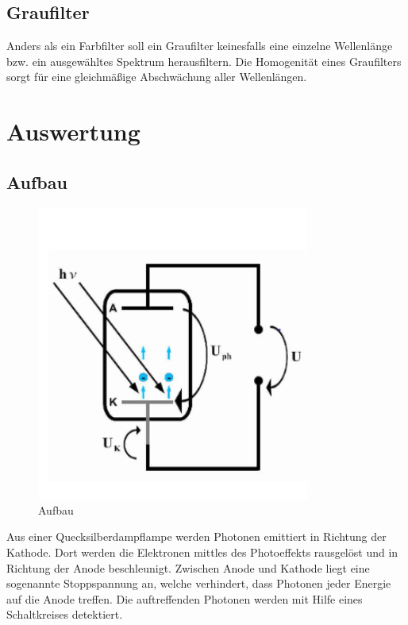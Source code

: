 \documentclass{scrartcl}
\begin{document}
	\subsection{Graufilter}
		Anders als ein Farbfilter soll ein Graufilter keinesfalls eine einzelne Wellenlänge bzw. ein ausgewähltes Spektrum 
		herausfiltern. Die Homogenität eines Graufilters sorgt für eine gleichmäßige Abschwächung aller Wellenlängen.
\section{Auswertung}
	\subsection{Aufbau}
		\begin{figure}[H]
			\centering
			\includegraphics[width=0.8\textwidth]{Aufbau.PNG}
			\caption{Aufbau}
		\end{figure}
		Aus einer Quecksilberdampflampe werden Photonen emittiert in Richtung der Kathode. Dort werden
		die Elektronen mittles des Photoeffekts rausgelöst und in Richtung der Anode beschleunigt.
		Zwischen Anode und Kathode liegt eine sogenannte Stoppspannung an, welche verhindert, dass Photonen jeder Energie 
		auf die Anode treffen. Die auftreffenden Photonen werden mit Hilfe eines Schaltkreises detektiert.
\end{document}
